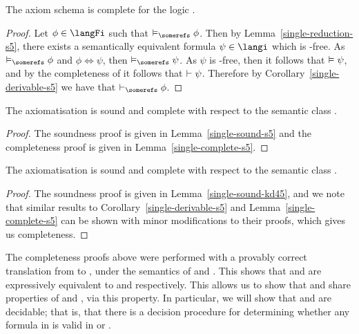 \begin{lemma}\label{single-complete-s5}
The axiom schema \axiomSiF{} is complete for the logic \logicSiF{}.
\end{lemma}

\begin{proof}
Let $\phi \in \langFi$ such that $\entails_\somerefs \phi$. Then by
Lemma~\ref{single-reduction-s5}, there exists a semantically equivalent formula
$\psi \in \langi$ which is \somerefs-free. As $\entails_\somerefs \phi$ and
$\phi \iff \psi$, then $\entails_\somerefs \psi$. As $\psi$ is
\somerefs-free, then it follows that $\vDash \psi$, and by the
completeness of \axiomSiF{} it follows that $\vdash \psi$.
Therefore by Corollary~\ref{single-derivable-s5} we have that $\proves_\somerefs
\phi$.
\end{proof}

\begin{theorem}
The axiomatisation \axiomSiF{} is sound and complete with respect to the
semantic class \classSi{}.
\end{theorem}

\begin{proof}
The soundness proof is given in Lemma~\ref{single-sound-s5} and the completeness
proof is given in Lemma~\ref{single-complete-s5}.
\end{proof}

\begin{theorem}
The axiomatisation \axiomKDiF{} is sound and complete with respect to the
semantic class \classKDi{}.
\end{theorem}

\begin{proof}
The soundness proof is given in Lemma~\ref{single-sound-kd45}, and we note that
similar results to Corollary~\ref{single-derivable-s5} and
Lemma~\ref{single-complete-s5} can be shown with minor modifications to their
proofs, which gives us completeness.
\end{proof}

The completeness proofs above were performed with a provably correct translation
from \langFi{} to \langi{}, under the semantics of \logicSiF{} and \logicKDiF{}.
This shows that \logicSiF{} and \logicKDiF{} are expressively equivalent to
\logicSi{} and \logicKDi{} respectively. This allows us to show that \logicSiF{}
and \logicKDiF{} share properties of \logicSi{} and \logicKDi{}, via this
property. In particular, we will show that \logicSiF{} and \logicKDiF{} are
decidable; that is, that there is a decision procedure for determining whether
any formula in \langFi{} is valid in \logicSiF{} or \logicKDiF{}.

